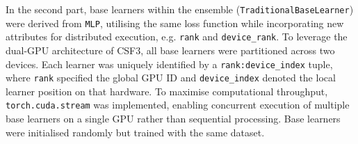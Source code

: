 In the second part, base learners within the ensemble (\texttt{TraditionalBaseLearner}) were derived from \texttt{MLP}, utilising the same loss function while incorporating new attributes for distributed execution, e.g. \texttt{rank} and \texttt{device\_rank}. To leverage the dual-GPU architecture of CSF3, all base learners were partitioned across two devices. Each learner was uniquely identified by a \texttt{rank:device\_index} tuple, where \texttt{rank} specified the global GPU ID and \texttt{device\_index} denoted the local learner position on that hardware. To maximise computational throughput, \texttt{torch.cuda.stream} was implemented, enabling concurrent execution of multiple base learners on a single GPU rather than sequential processing. Base learners were initialised randomly but trained with the same dataset. 

